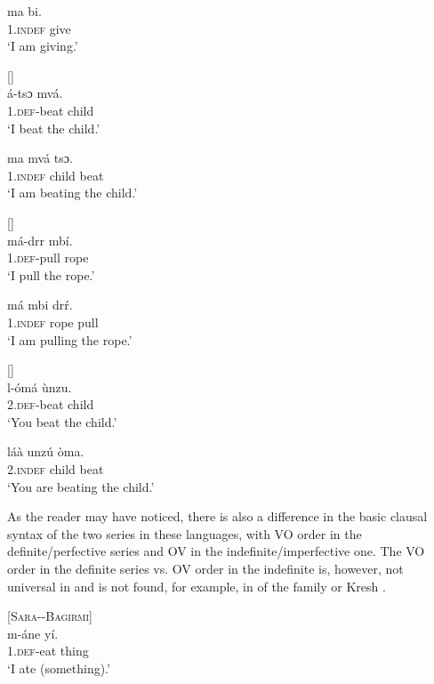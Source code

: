 \documentclass[output=paper]{langsci/langscibook}
\begin{document}
\ex \label{ex:anderson:51b}
\gll ma    bi.\\
 1.\textsc{indef}  give\\
\glt  `I am giving.'    
\z
\z

\newpage 
\ea\label{ex:anderson:52}
 \citep[47]{TuckerBryan1966}         [] \\
\ea\label{ex:anderson:52a}
\gll á-tsɔ    mvá.\\
  1.\textsc{def}-beat  child\\
  \glt `I beat the child.'
  
  \ex \label{ex:anderson:52b}
\gll ma    mvá  tsɔ.\\
  1.\textsc{indef}  child  beat\\
\glt `I am beating the child.'
\z
\z

\ea\label{ex:anderson:53}
  \citep[46]{TuckerBryan1966}         []\\
\ea\label{ex:anderson:53a}
\gll má-drr    mbí.\\
  1.\textsc{def}-pull  rope\\
  \glt `I pull the rope.' 

\ex\label{ex:anderson:53b}
\gll má    mbi  dr\'{r}.\\
  \textsc{1.indef}  rope  pull\\
\glt `I am pulling the rope.'
\z
\z

\ea\label{ex:anderson:54}
 \citep[48]{TuckerBryan1966}        []\\
\ea\label{ex:anderson:54a}
\gll l-ómá     ùnzu.\\
  \textsc{2.def}-beat  child\\
\glt `You beat the child.'


\ex \label{ex:anderson:54b}
\gll láà    unzú  òma.\\
  \textsc{2.indef}  child  beat\\
\glt `You are beating the child.'
\z
\z

As the reader may have noticed, there is also a difference in the basic clausal syntax of the two series in these  languages, with VO order in the definite/perfective series and OV in the indefinite/imperfective one. The VO order in the definite series vs. OV order in the indefinite is, however, not universal in  and is not found, for example, in   of the  family or Kresh .

\ea\label{ex:anderson:55}
 \citep[75]{TuckerBryan1966}        [\textsc{Sara--Bagirmi}]\\
\ea\label{ex:anderson:55a}
\gll m-áne    yí.\\
  \textsc{1.def}-eat  thing\\
\glt `I ate (something).'
\end{document}

